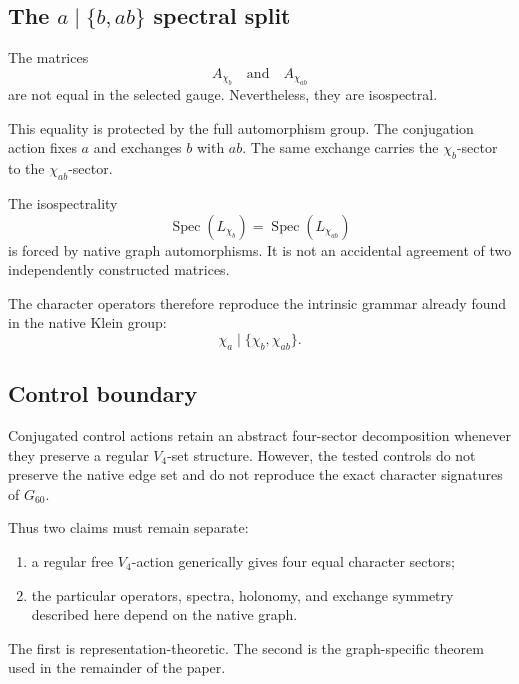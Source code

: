 \subsection{The \(a\mid\{b,ab\}\) spectral split}

The matrices
\[
A_{\chi_b}
\quad\text{and}\quad
A_{\chi_{ab}}
\]
are not equal in the selected gauge. Nevertheless, they are
isospectral.

This equality is protected by the full automorphism group. The
conjugation action fixes \(a\) and exchanges \(b\) with \(ab\). The
same exchange carries the \(\chi_b\)-sector to the
\(\chi_{ab}\)-sector.

\begin{theorem}
The isospectrality
\[
\operatorname{Spec}(L_{\chi_b})
=
\operatorname{Spec}(L_{\chi_{ab}})
\]
is forced by native graph automorphisms. It is not an accidental
agreement of two independently constructed matrices.
\end{theorem}

The character operators therefore reproduce the intrinsic grammar
already found in the native Klein group:
\[
\chi_a
\mid
\{\chi_b,\chi_{ab}\}.
\]

\subsection{Control boundary}

Conjugated control actions retain an abstract four-sector
decomposition whenever they preserve a regular \(V_4\)-set structure.
However, the tested controls do not preserve the native edge set and
do not reproduce the exact character signatures of \(G_{60}\).

Thus two claims must remain separate:

\begin{enumerate}
    \item a regular free \(V_4\)-action generically gives four equal
    character sectors;

    \item the particular operators, spectra, holonomy, and exchange
    symmetry described here depend on the native graph.
\end{enumerate}

The first is representation-theoretic. The second is the
graph-specific theorem used in the remainder of the paper.
